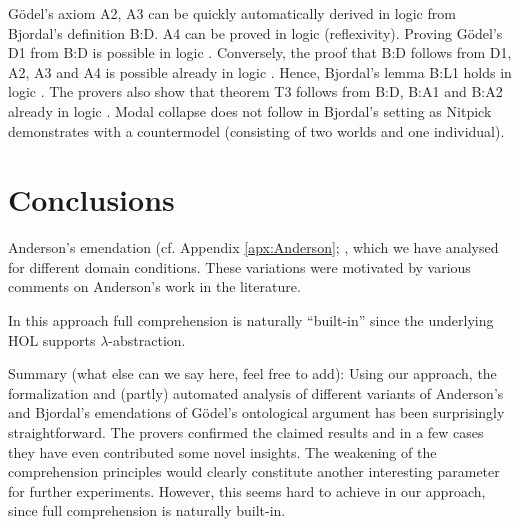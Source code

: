 \documentclass{birkjour}
\theoremstyle{definition}
\theoremstyle{remark}
\numberwithin{equation}{section}
\begin{document}
    G\"odel's axiom
  A2, A3 can be quickly automatically derived in logic \K from
  Bjordal's definition B:D. A4 can be proved in logic \KT
  (reflexivity). Proving G\"odel's D1 from B:D is possible in logic
  \KFour. Conversely, the proof that B:D follows from D1, A2, A3 and
  A4 is possible already in logic \K. Hence, Bjordal's lemma
  B:L1 holds in logic \SFour. The provers also show that theorem T3
  follows from B:D, B:A1 and B:A2 already in logic \KB. Modal collapse
  does not follow in Bjordal's setting as Nitpick demonstrates with a
  countermodel (consisting of two worlds and one individual). 




\section{Conclusions}

Anderson's emendation (cf. Appendix \ref{apx:Anderson}; ,
which we have analysed for different domain conditions. These
variations were motivated by various comments on Anderson's work in
the literature. 

In this approach full comprehension is
naturally ``built-in'' since the underlying HOL supports
$\lambda$-abstraction.

Summary (what else can we say here, feel free to add): Using our approach, the formalization and (partly) automated
analysis of different variants of Anderson's and Bjordal's emendations
of G\"odel's ontological argument has been surprisingly
straightforward. The provers confirmed the claimed results and in a
few cases they have even contributed some novel insights. The
weakening of the comprehension principles would clearly constitute
another interesting parameter for further experiments. However, this
seems hard to achieve in our approach, since full comprehension is
naturally built-in.


%
%

\printbibliography
\end{document}
